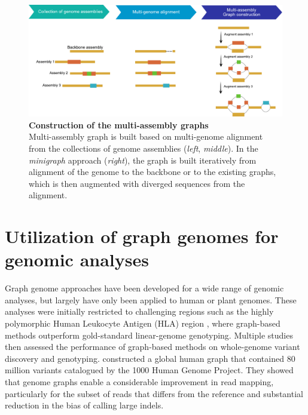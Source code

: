 \documentclass[../main.tex]{subfiles}
\begin{document}
\begin{figure}[!htb]
    \centering
    \includegraphics[width=\textwidth]{intro/fig6.pdf}
        \vspace{3mm}
        \caption[Construction of the multi-assembly graphs]{\textbf{Construction of the multi-assembly graphs} \\
        \footnotesize{Multi-assembly graph is built based on multi-genome alignment from the collections of genome assemblies (\emph{left}, \emph{middle}). In the \emph{minigraph} approach (\emph{right}), the graph is built iteratively from alignment of the genome to the backbone or to the existing graphs, which is then augmented with diverged sequences from the alignment.}}
        \label{fig16:multi}
\end{figure}

\section[Utilization of the graph genomes]{Utilization of graph genomes for genomic analyses}

Graph genome approaches have been developed for a wide range of genomic analyses, but largely have only been applied to human or plant genomes. These analyses were initially restricted to challenging regions such as the highly polymorphic Human Leukocyte Antigen (HLA) region \citep{dilthey2015improved,lee2018kourami}, where graph-based methods outperform gold-standard linear-genome genotyping. Multiple studies \citep{eggertsson2017graphtyper,garrison2018variation,sibbesen2018accurate,rakocevic2019fast}
 then assessed the performance of graph-based methods on whole-genome variant discovery and genotyping. \citet{garrison2018variation} constructed a global human graph that contained 80 million variants catalogued by the 1000 Human Genome Project. They showed that genome graphs enable a considerable improvement in read mapping, particularly for the subset of reads that differs from the reference and substantial reduction in the bias of calling large indels. 
\end{document}
